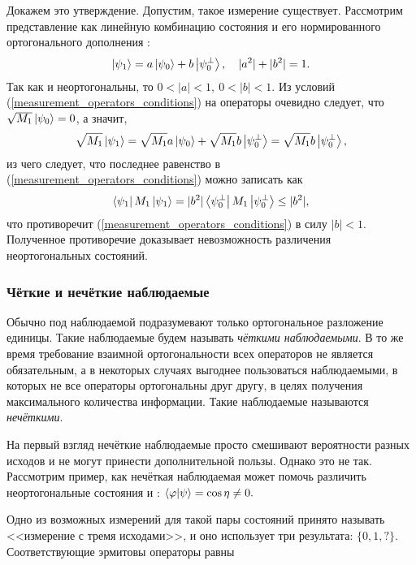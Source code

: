 Докажем это утверждение. Допустим, такое измерение существует. Рассмотрим представление  как линейную комбинацию состояния  и его нормированного ортогонального дополнения :
\begin{equation} \left| \psi_1 \right\rangle = a\left| \psi_0 \right\rangle + b\left| \psi_0^\bot \right\rangle,\quad |a^2| + |b^2| = 1. \end{equation}
Так как  и  неортогональны, то $0 < |a| < 1,\  0 < |b| < 1$.
Из условий (\ref{measurement_operators_conditions}) на операторы очевидно следует, что $\sqrt{M_1}\left| \psi_0 \right\rangle = 0$, а значит,
\begin{equation} \sqrt{M_1}\left| \psi_1 \right\rangle = \sqrt{M_1} a\left| \psi_0 \right\rangle + \sqrt{M_1} b\left| \psi_0^\bot \right\rangle = 
\sqrt{M_1} b\left| \psi_0^\bot \right\rangle, \end{equation}
из чего следует, что последнее равенство в (\ref{measurement_operators_conditions}) можно записать как
\begin{equation} \left\langle \psi_1 \right| M_1 \left| \psi_1 \right\rangle = |b^2| \left\langle \psi_0^\bot \right| M_1 \left| \psi_0^\bot \right\rangle \leq |b^2|, \end{equation}
что противоречит (\ref{measurement_operators_conditions}) в силу $|b| < 1$. Полученное противоречие доказывает невозможность различения неортогональных состояний.

\subsubsection{Чёткие и нечёткие наблюдаемые}
Обычно под наблюдаемой подразумевают только ортогональное разложение единицы. Такие наблюдаемые будем называть \textit{чёткими наблюдаемыми}\cite{holevo}. В то же время требование взаимной ортогональности всех операторов не является обязательным, а в некоторых случаях выгоднее пользоваться наблюдаемыми, в которых не все операторы ортогональны друг другу, в целях получения максимального количества информации. Такие наблюдаемые называются \textit{нечёткими}.

На первый взгляд нечёткие наблюдаемые просто смешивают вероятности разных исходов и не могут принести дополнительной пользы. Однако это не так.
Рассмотрим пример, как нечёткая наблюдаемая может помочь различить неортогональные состояния \state{\varphi} и \state{\psi}: $ \left\langle \varphi|\psi\right\rangle = \cos \eta \neq 0.$

Одно из возможных измерений для такой пары состояний принято называть <<измерение с тремя исходами>>, и оно использует три результата: $\{0, 1, ?\}$. Соответствующие эрмитовы операторы равны

